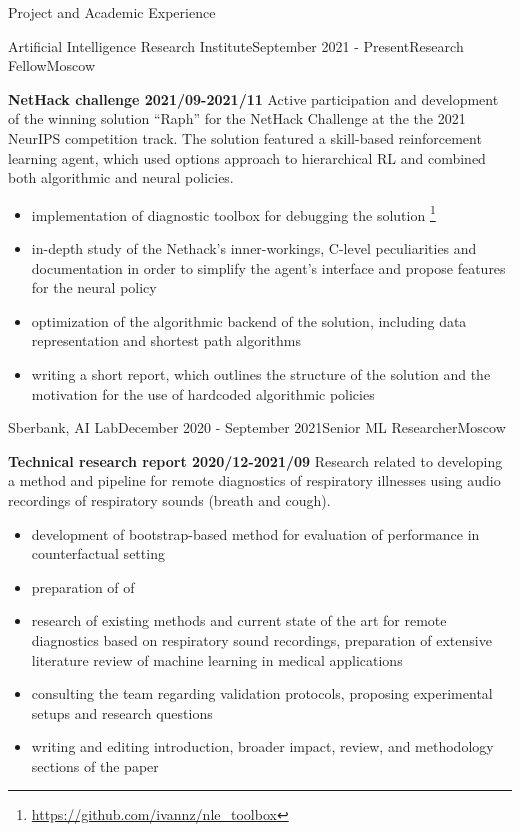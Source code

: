 \documentclass{resume} %
\begin{document}
\begin{rSection}{Project and Academic Experience}
\begin{rSubsection}{Artificial Intelligence Research Institute}{September 2021 - Present}{Research Fellow}{Moscow}
    \item \textbf{NetHack challenge 2021/09-2021/11}
    Active participation and development of the winning solution ``Raph'' for the NetHack
    Challenge at the the 2021 NeurIPS competition track. The solution featured a skill-based
    reinforcement learning agent, which used options approach to hierarchical RL and combined
    both algorithmic and neural policies.
    \begin{itemize}
        \item implementation of diagnostic toolbox for debugging the solution%
            \footnote{\url{https://github.com/ivannz/nle_toolbox}}
        \item in-depth study of the Nethack's inner-workings, C-level peculiarities and
        documentation in order to simplify the agent's interface and propose features for
        the neural policy
        \item optimization of the algorithmic backend of the solution, including data representation
        and shortest path algorithms
        \item writing a short report, which outlines the structure of the solution and
        the motivation for the use of hardcoded algorithmic policies
    \end{itemize}
\end{rSubsection}

\begin{rSubsection}{Sberbank, AI Lab}{December 2020 - September 2021}{Senior ML Researcher}{Moscow}
    \item \textbf{Technical research report 2020/12-2021/09}
    Research related to developing a method and pipeline for remote diagnostics of respiratory
    illnesses using audio recordings of respiratory sounds (breath and cough).
    \begin{itemize}
        \item development of bootstrap-based method for evaluation of performance in
        counterfactual setting  %
        \item preparation of  of 
        \item research of existing methods and current state of the art for remote diagnostics
        based on respiratory sound recordings, preparation of extensive literature review of
        machine learning in medical applications
        \item consulting the team regarding validation protocols, proposing experimental
        setups and research questions
        \item writing and editing introduction, broader impact, review, and methodology sections 
        of the paper
    \end{itemize}
\end{rSubsection}


\end{rSection}
\end{document}
